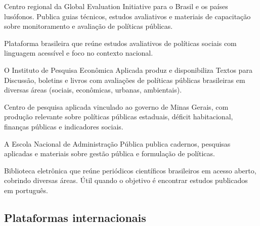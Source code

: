 \documentclass[12pt, a4paper, openany]{book}
\begin{document}
\begin{description}[leftmargin=2em, labelwidth=0pt]
  \item[\textbf{FGV CLEAR} (\url{fgvclear.org})] Centro regional da Global
    Evaluation Initiative para o Brasil e os países lusófonos. Publica guias
    técnicos, estudos avaliativos e materiais de capacitação sobre
    monitoramento e avaliação de políticas públicas.
  \item[\textbf{Impacto IMDS} (\url{impacto.imdsbrasil.org})] Plataforma
    brasileira que reúne estudos avaliativos de políticas sociais com
    linguagem acessível e foco no contexto nacional.
  \item[\textbf{IPEA} (\url{ipea.gov.br})] O Instituto de Pesquisa Econômica
    Aplicada produz e disponibiliza Textos para Discussão, boletins e livros
    com avaliações de políticas públicas brasileiras em diversas áreas
    (sociais, econômicas, urbanas, ambientais).
  \item[\textbf{Fundação João Pinheiro --- FJP}
    (\url{fjp.mg.gov.br})] Centro de pesquisa aplicada vinculado ao governo
    de Minas Gerais, com produção relevante sobre políticas públicas
    estaduais, déficit habitacional, finanças públicas e indicadores
    sociais.
  \item[\textbf{ENAP} (\url{enap.gov.br})] A Escola Nacional de Administração
    Pública publica cadernos, pesquisas aplicadas e materiais sobre gestão
    pública e formulação de políticas.
  \item[\textbf{SciELO Brasil} (\url{scielo.br})] Biblioteca eletrônica que
    reúne periódicos científicos brasileiros em acesso aberto, cobrindo
    diversas áreas. Útil quando o objetivo é encontrar estudos publicados em
    português.
\end{description}

\subsection{Plataformas internacionais}
\end{document}
